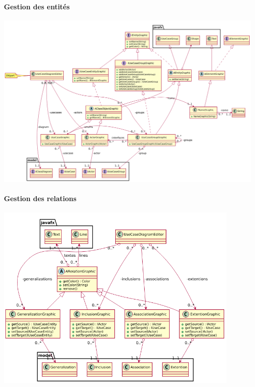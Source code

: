 \documentclass[a4paper,10pt]{article}
\begin{document}
	 \paragraph{Gestion des entités}
	  \begin{center}
	      \includegraphics[width=\textwidth]{Image/UseCaseDiagramEditor.png}
	  \end{center}
	  
	 \paragraph{Gestion des relations}
	  \begin{center}
	      \includegraphics[width=12cm]{Image/UseCaseDiagramEditorRelation.png}
	  \end{center}
   
\end{document}
